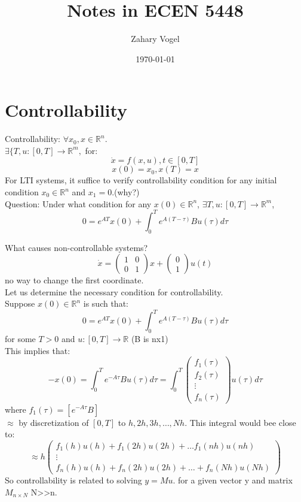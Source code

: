 \documentclass{article}
\author{Zahary Vogel}
\date{\today}
\title{Notes in ECEN 5448}
\begin{document}
\maketitle


\section{Controllability}
Controllability: $\forall x_0,x\in\mathbb{R}^n$.\\
$\exists \{T, u:[0,T]\to\mathbb{R}^m,$ for:\\
\[\dot{x}=f(x,u), t\in[0,T]\]
\[x(0)=x_0, x(T)=x\]
For LTI systems, it suffice to verify controllability condition for any initial condition $x_0\in\mathbb{R}^n$ and $x_1=0$.(why?)\\

Question: Under what condition for any $x(0)\in\mathbb{R}^n$, $\exists T,u:[0,T]\to \mathbb{R}^m$,\\
\[0=e^{AT}x(0)+\int_0^Te^{A(T-\tau)}Bu(\tau)d\tau\]

What causes non-controllable systems?\\
\[\dot{x}=\begin{pmatrix}1 & 0\\0 & 1\end{pmatrix}x+\begin{pmatrix}0\\1\end{pmatrix}u(t)\]
no way to change the first coordinate.\\

Let us determine the necessary condition for controllability.\\
Suppose $x(0)\in\mathbb{R}^n$ is such that:
\[0=e^{AT}x(0)+\int_0^Te^{A(T-\tau)}Bu(\tau)d\tau\]
for some $T>0$ and $u:[0,T]\to\mathbb{R}$ (B is nx1)\\
This implies that:\\
\[-x(0)=\int_0^Te^{-A\tau}Bu(\tau)d\tau=\int_0^T\begin{pmatrix}f_1(\tau)\\f_2(\tau)\\\vdots\\f_n(\tau)\end{pmatrix}u(\tau)d\tau\]
where $f_1(\tau)=[e^{-A\tau}B]$\\
$\approx$ by discretization of $[0,T]$ to $h,2h,3h,\dots,Nh$. This integral would bee close to:\\
\[\approx h\begin{pmatrix}f_1(h)u(h)+f_1(2h)u(2h)+\dots f_1(nh)u(nh)\\\vdots\\f_n(h)u(h)+f_n(2h)u(2h)+\dots+f_n(Nh)u(Nh)\end{pmatrix}\]
So controllability is related to solving $y=Mu$. for a given vector y and matrix $M_{n\times N}$ N>>n.\\
\end{document}
